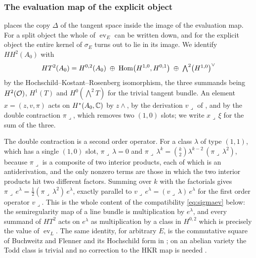 \subsubsection*{The evaluation map of the explicit object}

 places the copy $\Delta$ of the tangent space inside the
image of the evaluation map. For a split object the whole of
$\operatorname{ev}_{E}$ can be written down, and for the explicit object the
entire kernel of $\sigma_{E}$ turns out to lie in its image. We identify
$HH^{2}(A_{0})$ with
\begin{equation}\label{eq:HT2}
  HT^{2}(A_{0})
  =H^{0,2}(A_{0})\;\oplus\;\operatorname{Hom}\bigl(H^{1,0},H^{0,1}\bigr)\;\oplus\;
   \textstyle\bigwedge^{2}\bigl(H^{1,0}\bigr)^{\vee}
\end{equation}
by the Hochschild--Kostant--Rosenberg isomorphism, the three summands being
$H^{2}(\mathcal{O})$, $H^{1}(T)$ and $H^{0}(\bigwedge^{2}T)$ for the trivial tangent
bundle. An element $x=(z,v,\pi)$ acts on $H^{*}(A_{0},\mathbb{C})$ by $z\wedge$, by
the derivation $v\lrcorner$ of , and by the double
contraction $\pi\lrcorner$, which removes two $(1,0)$ slots; we write
$x\lrcorner\,\xi$ for the sum of the three.

The double contraction is a second order operator. For a class $\lambda$ of
type $(1,1)$, which has a single $(1,0)$ slot, $\pi\lrcorner\,\lambda=0$ and
$\pi\lrcorner\,\lambda^{k}=\binom{k}{2}\lambda^{k-2}\,(\pi\lrcorner\,\lambda^{2})$,
because $\pi\lrcorner$ is a composite of two interior products, each of which
is an antiderivation, and the only nonzero terms are those in which the two
interior products hit two different factors. Summing over $k$ with the
factorials gives
$\pi\lrcorner\,e^{\lambda}=\tfrac12(\pi\lrcorner\,\lambda^{2})\,e^{\lambda}$,
exactly parallel to $v\lrcorner\,e^{\lambda}=(v\lrcorner\,\lambda)\,e^{\lambda}$
for the first order operator $v\lrcorner$. This is the whole content of the
compatibility \eqref{eq:sigmaev} below: the semiregularity map of a line
bundle is multiplication by $e^{\lambda}$, and every summand of $HT^{2}$ acts
on $e^{\lambda}$ as multiplication by a class in $H^{0,2}$ which is precisely
the value of $\operatorname{ev}_{L}$. The same identity, for arbitrary $E$, is
the commutative square of Buchweitz and Flenner \cite[Corollary 4.3]{BF03} and
its Hochschild form in \cite[Lemma 11.3]{Mar25b}; on an abelian variety the
Todd class is trivial and no correction to the HKR map is needed
\cite{Cal05,BF08}.

